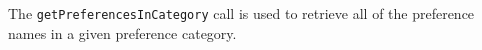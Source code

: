 The \verb+getPreferencesInCategory+ call is used to retrieve all of the preference names in a given preference category.
 
